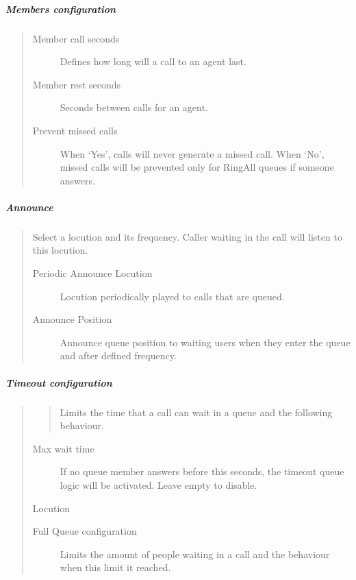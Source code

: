 \documentclass[letterpaper,10pt,english]{sphinxmanual}
\begin{document}
\subparagraph{Members configuration}
\label{administration_portal/client/vpbx/routing_endpoints/queues:members-configuration}\begin{quote}
\begin{description}
\item[{Member call seconds}] \leavevmode
Defines how long will a call to an agent last.

\item[{Member rest seconds}] \leavevmode
Seconds between calls for an agent.

\item[{Prevent missed calls}] \leavevmode
When `Yes', calls will never generate a missed call. When `No', missed calls will be prevented only for RingAll
queues if someone answers.

\end{description}
\end{quote}


\subparagraph{Announce}
\label{administration_portal/client/vpbx/routing_endpoints/queues:announce}\begin{quote}

Select a locution and its frequency. Caller waiting in the call will listen
to this locution.
\begin{description}
\item[{Periodic Announce Locution}] \leavevmode
Locution periodically played to calls that are queued.

\item[{Announce Position}] \leavevmode
Announce queue position to waiting users when they enter the queue and after
defined frequency.

\end{description}
\end{quote}


\subparagraph{Timeout configuration}
\label{administration_portal/client/vpbx/routing_endpoints/queues:timeout-configuration}\begin{quote}
\begin{quote}

Limits the time that a call can wait in a queue and the following behaviour.
\end{quote}
\begin{description}
\item[{Max wait time}] \leavevmode
If no queue member answers before this seconds, the timeout queue logic
will be activated. Leave empty to disable.

\end{description}

Locution
\begin{description}
\item[{Full Queue configuration}] \leavevmode
Limits the amount of people waiting in a call and the behaviour when this limit
it reached.

\end{description}
\end{quote}
\end{document}
